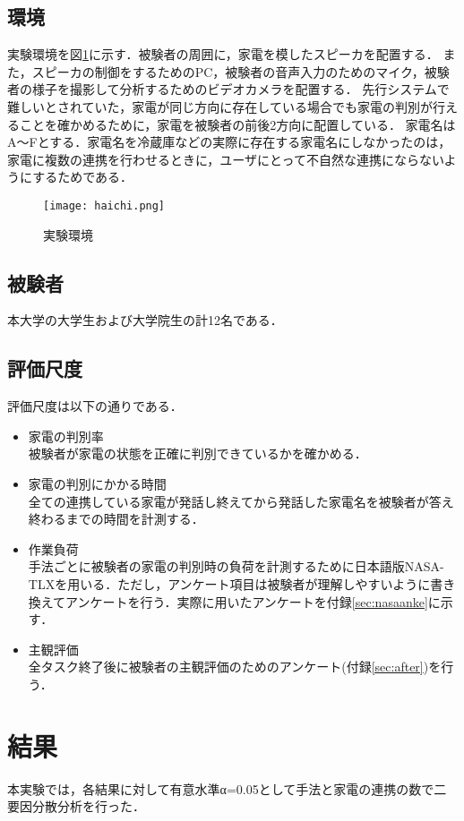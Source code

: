 \documentclass[a4j,12pt,twoside]{jreport}
\begin{document}
\subsection{環境}
実験環境を図\ref{fig:haichi}に示す．被験者の周囲に，家電を模したスピーカを配置する．
また，スピーカの制御をするためのPC，被験者の音声入力のためのマイク，被験者の様子を撮影して分析するためのビデオカメラを配置する．
先行システムで難しいとされていた，家電が同じ方向に存在している場合でも家電の判別が行えることを確かめるために，家電を被験者の前後2方向に配置している．
家電名はA〜Fとする．家電名を冷蔵庫などの実際に存在する家電名にしなかったのは，家電に複数の連携を行わせるときに，ユーザにとって不自然な連携にならないようにするためである．

\begin{figure}[p]
  \centering
  \texttt{[image: haichi.png]}
     \caption{実験環境}
        \label{fig:haichi}
\end{figure}
\subsection{被験者}
本大学の大学生および大学院生の計12名である．

\subsection{評価尺度}
評価尺度は以下の通りである．
\begin{itemize}
	\item 家電の判別率\\
	被験者が家電の状態を正確に判別できているかを確かめる．
	\item 家電の判別にかかる時間\\
	全ての連携している家電が発話し終えてから発話した家電名を被験者が答え終わるまでの時間を計測する．
	\item 作業負荷\\
	手法ごとに被験者の家電の判別時の負荷を計測するために日本語版NASA-TLX\cite{nasa}を用いる．ただし，アンケート項目は被験者が理解しやすいように書き換えてアンケートを行う．実際に用いたアンケートを付録\ref{sec:nasaanke}に示す．
	\item 主観評価\\
	全タスク終了後に被験者の主観評価のためのアンケート(付録\ref{sec:after})を行う．
\end{itemize}

\section{結果}
本実験では，各結果に対して有意水準α=0.05として手法と家電の連携の数で二要因分散分析を行った．
\end{document}
